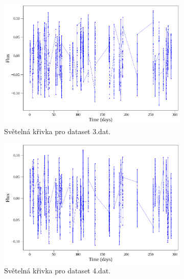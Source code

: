 \documentclass[a4paper,11pt,twocolumn]{article}
\begin{document}
\begin{figure}
\begin{subfigure}[t]{0.48\textwidth}
                    \centering
                    \includegraphics[width=\textwidth]{3_ls.png}
                    \caption{Světelná křivka pro dataset 3.dat.}
                    \label{fig:3_ls}
                \end{subfigure}
                \vspace{10pt}
                \begin{subfigure}[t]{0.48\textwidth}
                    \centering
                    \includegraphics[width=\textwidth]{4_ls.png}
                    \caption{Světelná křivka pro dataset 4.dat.}
                    \label{fig:4_ls}
                \end{subfigure}
                \hfill
                \begin{subfigure}[t]{0.48\textwidth}
                    \centering

\end{subfigure}
\end{figure}
\end{document}
